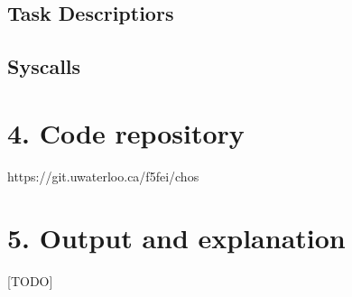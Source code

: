 \documentclass{article}
\begin{document}
\subsection*{Task Descriptiors}

\subsection*{Syscalls}


\section*{4. Code repository}

https://git.uwaterloo.ca/f5fei/chos

\section*{5. Output and explanation}

[TODO]
\end{document}
